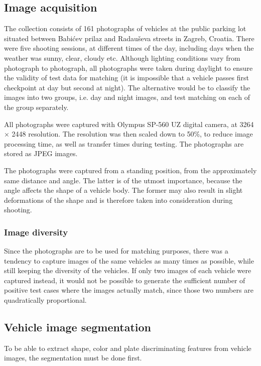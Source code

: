 \documentclass[times, utf8, zavrsni]{fer}
\begin{document}
\subsection{Image acquisition}

The collection consists of 161 photographs of vehicles at the public parking lot
situated between Babićev prilaz and Radauševa streets in Zagreb, Croatia. There
were five shooting sessions, at different times of the day, including days
when the weather was sunny, clear, cloudy etc. Although lighting conditions
vary from photograph to photograph, all photographs were taken during daylight
to ensure the validity of test data for matching (it is impossible that a
vehicle passes first checkpoint at day but second at night). The alternative
would be to classify the images into two groups, i.e. day and night images, and
test matching on each of the group separately.

All photographs were captured with Olympus SP-560 UZ digital camera, at 3264
$\times$ 2448 resolution. The resolution was then scaled down to 50\%, to reduce
image processing time, as well as transfer times during testing. The photographs
are stored as JPEG images.

The photographs were captured from a standing position, from the approximately
same distance and angle. The latter is of the utmost importance, because the
angle affects the shape of a vehicle body. The former may also result in slight
deformations of the shape and is therefore taken into consideration during
shooting.

\subsubsection{Image diversity}
Since the photographs are to be used for matching purposes, there was a tendency
to capture images of the same vehicles as many times as possible, while still
keeping the diversity of the vehicles. If only two images of each vehicle were
captured instead, it would not be possible to generate the sufficient number of
positive test cases where the images actually match, since those two numbers are
quadratically proportional. 


\subsection{Vehicle image segmentation}
To be able to extract shape, color and plate discriminating features from
vehicle images, the segmentation must be done first.
\end{document}
